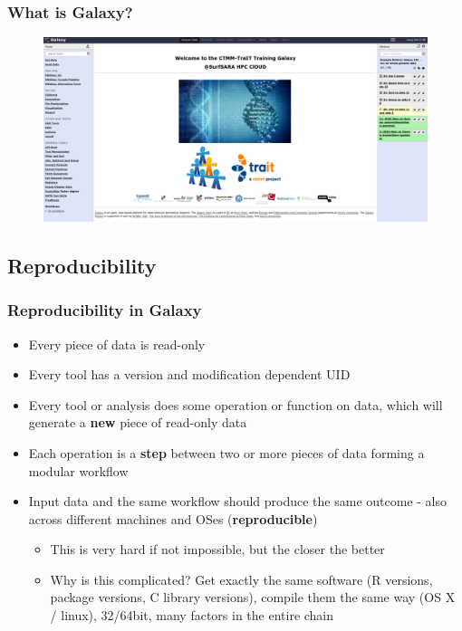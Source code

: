 \documentclass{beamer}              %
\begin{document}
\begin{frame}
    \frametitle{What is Galaxy?}
	\begin{figure}
		\includegraphics[width=\textwidth]{figures/101p_02.png}
	\end{figure}
\end{frame}

\subsection{Reproducibility}
\begin{frame}
    \frametitle{Reproducibility in Galaxy}
    \begin{itemize}
	    \item Every piece of data is read-only
	    \item Every tool has a version and modification dependent UID
	    \item Every tool or analysis does some operation or function on data, which will generate a \textbf{new} piece of read-only data
	    \item Each operation is a \textbf{step} between two or more pieces of data forming a modular workflow
	    \item Input data and the same workflow should produce the same outcome - also across different machines and OSes (\textbf{reproducible})
    	\begin{itemize}
	    	\item This is very hard if not impossible, but the closer the better
	    	\item Why is this complicated? Get exactly the same software (R versions, package versions, C library versions), compile them the same way (OS X / linux), 32/64bit, many factors in the entire chain
    	\end{itemize}
    \end{itemize}
\end{frame}
\end{document}

